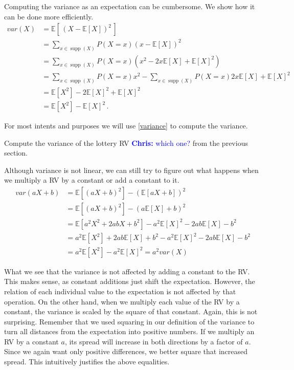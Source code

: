 \documentclass[a4paper,11pt,leqno]{report}
\newcommand{\chris}[1]{ \textcolor{blue}{\textbf{Chris:} #1}}
\newcommand{\supp}{\operatorname{supp}}
\newcommand{\E}{\mathbb{E}}
\begin{document}
Computing the variance as an expectation can be cumbersome. We show how it can be done more efficiently.
\begin{align}
var(X) &= \E[\, (X - \E[X])^{2} \, ] \\
&= \sum_{x \in \supp(X)} P(X=x) (x - \E[X])^{2} \\
&= \sum_{x \in \supp(X)} P(X=x) (x^2 - 2x\E[X] + \E[X]^{2}) \\
&= \sum_{x \in \supp(X)} P(X=x)  x^{2} -  \!\!\!\!\! \sum_{x \in \supp(X)} \!\!\!\!\! P(X=x) 2x\E[X] + \E[X]^{2} \\
&= \E[X^{2}] -   2 \E[X]^{2} + \E[X]^{2}  \\
&= \E[X^{2}] - \E[X]^{2} \, . \label{variance}
\end{align}

For most intents and purposes we will use \eqref{variance} to compute the variance. 


\begin{Exercise}
Compute the variance of the lottery RV\chris{which one?} from the previous section.
\end{Exercise}

Although variance is not linear, we can still try to figure out what happens when we multiply a RV by a constant or add a constant to it.
\begin{align}
var(aX+b) &= \E[(aX+b)^{2}] - (\E[aX+b])^{2} \\
&= \E[(aX+b)^{2}] - (a\E[X]+b)^{2} \\
&= \E[a^{2}X^{2} + 2abX + b^{2}] - a^{2}\E[X]^{2} - 2ab\E[X] - b^{2} \\
&= a^{2}\E[X^{2}] + 2ab\E[X] + b^{2} - a^{2}\E[X]^{2} - 2ab\E[X] - b^{2} \\
&= a^{2}\E[X^{2}] - a^{2}\E[X]^{2} = a^{2}var(X) \
\end{align}

What we see that the variance is not affected by adding a constant to the RV. This makes sense, as constant additions just shift
the expectation. However, the relation of each individual value to the expectation is not affected by that operation. On the other hand,
when we multiply each value of the RV by a constant, the variance is scaled by the square of that constant. Again, this is not surprising.
Remember that we used squaring in our definition of the variance to turn all distances from the expectation into positive numbers.
If we multiply an RV by a constant $ a $, its spread will increase in both directions by a factor of $ a $. 
Since we again want only positive differences,
we better square that increased spread. This intuitively justifies the above equalities.
\end{document}
